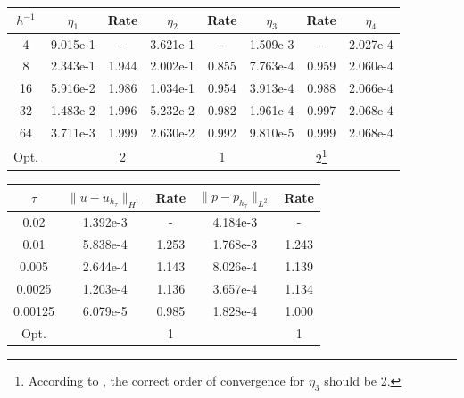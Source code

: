 \begin{center} 
\centering
\begin{tabular}{c|c|c|c|c|c|c|c}
$h^{-1}$ & $\eta_1$ & Rate &  $\eta_2$ & Rate & $\eta_3$ & Rate & $\eta_4$\\\hline
4  & 9.015e-1 & -     & 3.621e-1 & -     & 1.509e-3 & -     & 2.027e-4 \\
8  & 2.343e-1 & 1.944 & 2.002e-1 & 0.855 & 7.763e-4 & 0.959 & 2.060e-4 \\
16 & 5.916e-2 & 1.986 &1.034e-1  & 0.954 & 3.913e-4 & 0.988 & 2.066e-4 \\
32 & 1.483e-2 & 1.996 & 5.232e-2 & 0.982 & 1.961e-4 & 0.997 & 2.068e-4 \\
64 & 3.711e-3 & 1.999 & 2.630e-2 & 0.992 & 9.810e-5 & 0.999 & 2.068e-4 \\\hline
Opt. & & 2 & & 1 & & 2\footnote[1]{According to \cite{meunier}, the correct order of convergence for $\eta_3$ should be 2.} & 
\end{tabular}
 \label{tab:biot_default_space_est}
\end{center}
\begin{center}
\centering
\begin{tabular}{c|c|c|c|c}
$\tau$ & $\|u-u_{h_{\tau}}\|_{H^1}$ & Rate & $\|p-p_{h_{\tau}}\|_{L^2}$ & Rate \\\hline
0.02    & 1.392e-3 & -     & 4.184e-3 & -     \\
0.01    & 5.838e-4 & 1.253 & 1.768e-3 & 1.243 \\
0.005   & 2.644e-4 & 1.143 & 8.026e-4 & 1.139 \\
0.0025  & 1.203e-4 & 1.136 & 3.657e-4 & 1.134 \\
0.00125 & 6.079e-5 & 0.985 & 1.828e-4 & 1.000 \\ \hline
Opt. & & 1 & & 1 
\end{tabular}
 \label{tab:biot_default_time_error}
\end{center}

